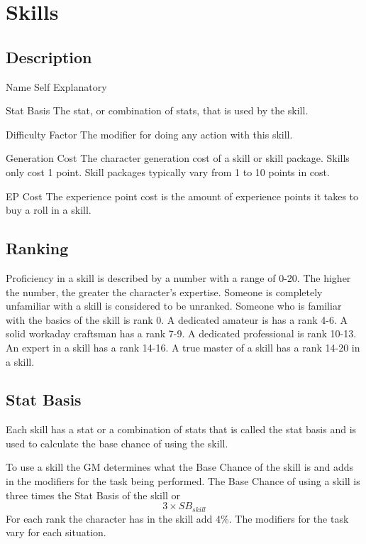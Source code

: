 \section{Skills}
\subsection{Description}

\begin{relate}
	\item[Name] 
	Self Explanatory
	\item[Stat Basis] 
	The stat, or combination of stats, that is used by the skill. 
	\item[Difficulty Factor] 
	The modifier for doing any action with this skill.
	\item[Generation Cost]
	The character generation cost of a skill or skill package. Skills
	only cost 1 point. Skill packages typically vary from 1
	to 10 points in cost.
	\item[EP Cost] 
	The experience point cost is the amount of experience points it takes to
	buy a roll in a skill. 
\end{relate}

\subsection{Ranking}

Proficiency in a skill is described by a number with a range of 0-20.
The higher the number, the greater the character's expertise. Someone
is completely unfamiliar with a skill is considered to be
{unranked}. Someone who is familiar with the basics of
the skill is rank 0. A dedicated amateur is has a rank 4-6. A
solid workaday craftsman has a rank 7-9. A dedicated professional is rank 
10-13. An expert in a skill has a rank 14-16. A true master of a skill has 
a rank 14-20 in a skill. 

\subsection{Stat Basis}

Each skill has a stat or a combination of stats that is called the 
stat basis and is used to calculate the base chance of using the 
skill. 

To use a skill the GM determines what the Base Chance of the skill is 
and adds in the modifiers for the task being performed.
The Base Chance of using a skill is three times the Stat Basis of the skill
or \[ 3 \times SB_{skill} \] For each rank the character has in the skill add 4\%.
The modifiers for the task vary for each situation.

